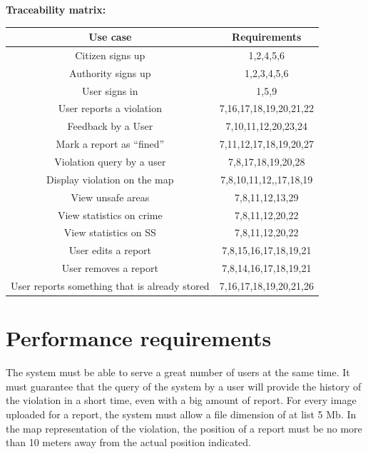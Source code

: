 \documentclass[../RASD.tex]{subfiles}
\begin{document}
                \newpage
                \textbf{Traceability matrix:}
                \begin{center}
                    \begin{tabular}{ ||c||c|| }

                        \hline
                        \textbf{Use case} & \textbf{Requirements}  \\ \hline
                        [\textbf{1}] Citizen signs up & 1,2,4,5,6 \\ \hline
                        [\textbf{2}] Authority signs up & 1,2,3,4,5,6\\ \hline
                        [\textbf{3}] User signs in & 1,5,9\\ \hline
                        [\textbf{4}] User reports a violation & 7,16,17,18,19,20,21,22\\ \hline
                        [\textbf{5}] Feedback by a User & 7,10,11,12,20,23,24\\ \hline
                        [\textbf{6}] Mark a report as “fined” & 7,11,12,17,18,19,20,27\\ \hline
                        [\textbf{7}] Violation query by a user & 7,8,17,18,19,20,28\\ \hline
                        [\textbf{8}] Display violation on the map & 7,8,10,11,12,,17,18,19\\ \hline
                        [\textbf{9}] View unsafe areas & 7,8,11,12,13,29\\ \hline
                        [\textbf{10}] View statistics on crime & 7,8,11,12,20,22\\ \hline
                        [\textbf{11}] View statistics on SS & 7,8,11,12,20,22\\ \hline
                        [\textbf{12}] User edits a report & 7,8,15,16,17,18,19,21\\ \hline
                        [\textbf{13}] User removes a report & 7,8,14,16,17,18,19,21\\ \hline
                        [\textbf{14}] User reports something that is already stored & 7,16,17,18,19,20,21,26\\ \hline
                    \end{tabular}
                \end{center}
        \section{Performance requirements}\label{sec:performance-requirements}
        The system must be able to serve a great number of users at the same time. It must guarantee that the query of the system by a user will provide the history of the violation in a short time, even with a big amount of report. For every image uploaded for a report, the system must allow a file dimension of at list 5 Mb. In the map representation of the violation, the position of a report must be no more than 10 meters away from the actual position indicated.
\end{document}
